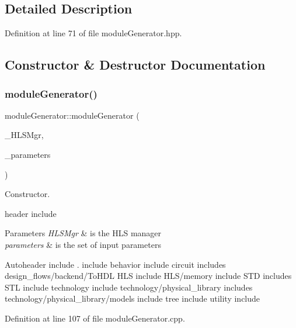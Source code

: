 \subsection{Detailed Description}


Definition at line 71 of file module\+Generator.\+hpp.



\subsection{Constructor \& Destructor Documentation}
\mbox{\label{classmoduleGenerator_a4b8eda51dd03d7cf90e378b10ee342e5}} 
\subsubsection{\texorpdfstring{module\+Generator()}{moduleGenerator()}}
{\footnotesize\ttfamily module\+Generator\+::module\+Generator (\begin{DoxyParamCaption}\item[{const \hyperlink{hls__manager_8hpp_a1b481383e3beabc89bd7562ae672dd8c}{H\+L\+S\+\_\+manager\+Const\+Ref}}]{\+\_\+\+H\+L\+S\+Mgr,  }\item[{const \hyperlink{Parameter_8hpp_a37841774a6fcb479b597fdf8955eb4ea}{Parameter\+Const\+Ref}}]{\+\_\+parameters }\end{DoxyParamCaption})}



Constructor. 

header include


\begin{DoxyParams}{Parameters}
{\em H\+L\+S\+Mgr} & is the H\+LS manager \\
\hline
{\em parameters} & is the set of input parameters\\
\hline
\end{DoxyParams}
Autoheader include . include behavior include circuit includes design\+\_\+flows/backend/\+To\+H\+DL H\+LS include H\+L\+S/memory include S\+TD includes S\+TL include technology include technology/physical\+\_\+library includes technology/physical\+\_\+library/models include tree include utility include 

Definition at line 107 of file module\+Generator.\+cpp.



